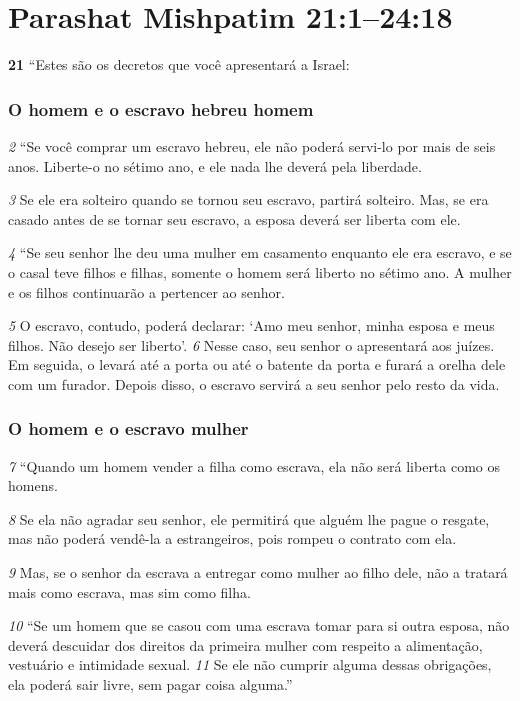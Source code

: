 \section*{Parashat Mishpatim 21:1–24:18}
   
\textbf{\large 21}
 “Estes são os decretos que você apresentará a Israel: 

\bigskip
\subsubsection*{O homem e o escravo hebreu homem}
\textit{\tiny 2} 
“Se você comprar um escravo hebreu, ele não poderá servi-lo por mais de seis
anos. Liberte-o no sétimo ano, e ele nada lhe deverá pela liberdade. 

\smallskip
\textit{\tiny 3} 
Se ele era
solteiro quando se tornou seu escravo, partirá solteiro. Mas, se era casado antes de
se tornar seu escravo, a esposa deverá ser liberta com ele. 

\smallskip
\textit{\tiny 4} 
“Se seu senhor lhe deu uma mulher em casamento enquanto ele era escravo, e
se o casal teve filhos e filhas, somente o homem será liberto no sétimo ano. A
mulher e os filhos continuarão a pertencer ao senhor. 

\smallskip
\textit{\tiny 5} 
O escravo, contudo,
poderá declarar: ‘Amo meu senhor, minha esposa e meus filhos. Não desejo ser
liberto’. 
\textit{\tiny 6} 
Nesse caso, seu senhor o apresentará aos juízes. Em seguida, o levará
até a porta ou até o batente da porta e furará a orelha dele com um furador.
Depois disso, o escravo servirá a seu senhor pelo resto da vida. 

\bigskip
\subsubsection*{O homem e o escravo mulher}
\textit{\tiny 7} 
“Quando um homem vender a filha como escrava, ela não será liberta como os
homens. 

\smallskip
\textit{\tiny 8} 
Se ela não agradar seu senhor, ele permitirá que alguém lhe pague o
resgate, mas não poderá vendê-la a estrangeiros, pois rompeu o contrato com ela. 

\smallskip
\textit{\tiny 9} 
Mas, se o senhor da escrava a entregar como mulher ao filho dele, não a tratará
mais como escrava, mas sim como filha.
   
\smallskip
\textit{\tiny 10}
“Se um homem que se casou com uma escrava tomar para si outra esposa,
não deverá descuidar dos direitos da primeira mulher com respeito a
alimentação, vestuário e intimidade sexual. 
\textit{\tiny 11}
Se ele não cumprir alguma dessas
obrigações, ela poderá sair livre, sem pagar coisa alguma.”

